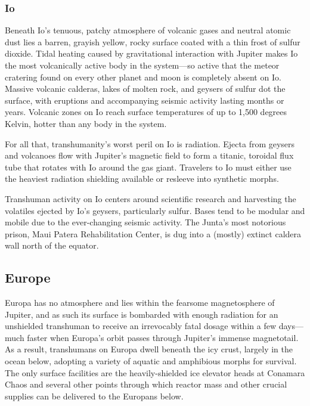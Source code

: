 \subsubsection{Io} \label{sec:io} 

Beneath Io's tenuous, patchy atmosphere of volcanic gases and neutral atomic dust lies a barren, grayish yellow, rocky surface coated with a thin frost of sulfur dioxide. Tidal heating caused by gravitational interaction with Jupiter makes Io the most volcanically active body in the system—so active that the meteor cratering found on every other planet and moon is completely absent on Io. Massive volcanic calderas, lakes of molten rock, and geysers of sulfur dot the surface, with eruptions and accompanying seismic activity lasting months or years. Volcanic zones on Io reach surface temperatures of up to 1,500 degrees Kelvin, hotter than any body in the system. 

For all that, transhumanity's worst peril on Io is radiation. Ejecta from geysers and volcanoes flow with Jupiter's magnetic field to form a titanic, toroidal flux tube that rotates with Io around the gas giant. Travelers to Io must either use the heaviest radiation shielding available or resleeve into synthetic morphs. 

Transhuman activity on Io centers around scientific research and harvesting the volatiles ejected by Io's geysers, particularly sulfur. Bases tend to be modular and mobile due to the ever-changing seismic activity. The Junta's most notorious prison, Maui Patera Rehabilitation Center, is dug into a (mostly) extinct caldera wall north of the equator. 

\subsection{Europe} \label{sec:europe} 

Europa has no atmosphere and lies within the fearsome magnetosphere of Jupiter, and as such its surface is bombarded with enough radiation for an unshielded transhuman to receive an irrevocably fatal dosage within a few days—much faster when Europa's orbit passes through Jupiter's immense magnetotail. As a result, transhumans on Europa dwell beneath the icy crust, largely in the ocean below, adopting a variety of aquatic and amphibious morphs for survival. The only surface facilities are the heavily-shielded ice elevator heads at Conamara Chaos and several other points through which reactor mass and other crucial supplies can be delivered to the Europans below. 

